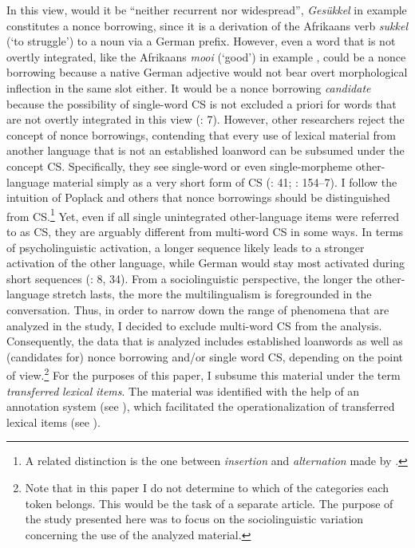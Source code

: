\documentclass[output=paper]{langsci/langscibook}
\begin{document}
In this view, would it be “neither recurrent nor widespread”, \textit{Gesükkel} in example  constitutes a nonce borrowing, since it is a derivation of the Afrikaans verb \textit{sukkel} (‘to struggle’) to a noun via a German prefix. However, even a word that is not overtly integrated, like the Afrikaans \textit{mooi} (‘good’) in example , could be a nonce borrowing because a native German adjective would not bear overt morphological inflection in the same slot either. It would be a nonce borrowing \textit{candidate} because the possibility of single-word CS is not excluded a priori for words that are not overtly integrated in this view (\citealt{poplack_social_1988}: 7). However, other researchers reject the concept of nonce borrowings, contending that every use of lexical material from another language that is not an established loanword can be subsumed under the concept CS. Specifically, they see single-word or even single-morpheme other-language material simply as a very short form of CS (\citealt{haspelmath_lexical_2009}: 41; \citealt{myers-scotton_contact_2002}: 154–7). I follow the intuition of Poplack and others that nonce borrowings should be distinguished from CS.\footnote{A related distinction is the one between \textit{insertion} and \textit{alternation} made by \citet{muysken_bilingual_2000}.} Yet, even if all single unintegrated other-language items were referred to as CS, they are arguably different from multi-word CS in some ways. In terms of psycholinguistic activation, a longer sequence likely leads to a stronger activation of the other language, while German would stay most activated during short sequences (\citealt{muysken_bilingual_2000}: 8, 34). From a sociolinguistic perspective, the longer the other-language stretch lasts, the more the multilingualism is foregrounded in the conversation. Thus, in order to narrow down the range of phenomena that are analyzed in the study, I decided to exclude multi-word CS from the analysis. Consequently, the data that is analyzed includes established loanwords as well as (candidates for) nonce borrowing and/or single word CS, depending on the point of view.\footnote{Note that in this paper I do not determine to which of the categories each token belongs. This would be the task of a separate article. The purpose of the study presented here was to focus on the sociolinguistic variation concerning the use of the analyzed material.} For the purposes of this paper, I subsume this material under the term \textit{transferred} \textit{lexical} \textit{items}. The material was identified with the help of an annotation system (see ), which facilitated the operationalization of transferred lexical items (see ).
\end{document}
